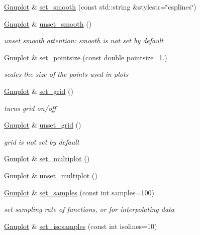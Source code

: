 \begin{DoxyCompactItemize}
\hyperlink{classGnuplot}{\-Gnuplot} \& \hyperlink{classGnuplot_aa18386919da2ec4c994f1f9c7195d384}{set\-\_\-smooth} (const std\-::string \&stylestr=\char`\"{}csplines\char`\"{})
\item 
\hyperlink{classGnuplot}{\-Gnuplot} \& \hyperlink{classGnuplot_ad9dfbccd66dece1dbe5803605c6ab08c}{unset\-\_\-smooth} ()
\begin{DoxyCompactList}\small\item\em unset smooth attention\-: smooth is not set by default \end{DoxyCompactList}\item 
\hyperlink{classGnuplot}{\-Gnuplot} \& \hyperlink{classGnuplot_a95ec1636a871447dfe99463b769339c7}{set\-\_\-pointsize} (const double pointsize=1.)
\begin{DoxyCompactList}\small\item\em scales the size of the points used in plots \end{DoxyCompactList}\item 
\hyperlink{classGnuplot}{\-Gnuplot} \& \hyperlink{classGnuplot_a5416c8e81f1b9945b9631fa85a8d4f47}{set\-\_\-grid} ()
\begin{DoxyCompactList}\small\item\em turns grid on/off \end{DoxyCompactList}\item 
\hyperlink{classGnuplot}{\-Gnuplot} \& \hyperlink{classGnuplot_a53183e1487bc6977f0d46bf75d19b4d3}{unset\-\_\-grid} ()
\begin{DoxyCompactList}\small\item\em grid is not set by default \end{DoxyCompactList}\item 
\hyperlink{classGnuplot}{\-Gnuplot} \& \hyperlink{classGnuplot_a67efc4d4dc46b6100d14ba2f7366ef11}{set\-\_\-multiplot} ()
\item 
\hyperlink{classGnuplot}{\-Gnuplot} \& \hyperlink{classGnuplot_aad76cdec16cfb5fdf82f45ed2786f4d8}{unset\-\_\-multiplot} ()
\item 
\hyperlink{classGnuplot}{\-Gnuplot} \& \hyperlink{classGnuplot_a671cbe7b18a267ea59f532c83a0035f6}{set\-\_\-samples} (const int samples=100)
\begin{DoxyCompactList}\small\item\em set sampling rate of functions, or for interpolating data \end{DoxyCompactList}\item 
\hyperlink{classGnuplot}{\-Gnuplot} \& \hyperlink{classGnuplot_ab810fa4c02fb49ae197786c305b78702}{set\-\_\-isosamples} (const int isolines=10)

\end{DoxyCompactItemize}
